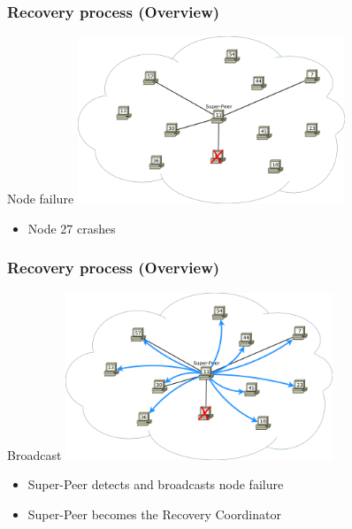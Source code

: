 \documentclass{beamer}
\begin{document}
	\begin{frame}
		\frametitle{Recovery process (Overview)}

		\begin{block}{Node failure}
			\center\includegraphics[width=8cm]{./img/Recovery_Overview_01}

			\begin{itemize}
				\item Node 27 crashes
			\end{itemize}
		\end{block}
	\end{frame}

	\begin{frame}
		\frametitle{Recovery process (Overview)}

		\begin{block}{Broadcast}
			\center\includegraphics[width=8cm]{./img/Recovery_Overview_02}

			\begin{itemize}
				\item Super-Peer detects and broadcasts node failure
				\item Super-Peer becomes the Recovery Coordinator
			\end{itemize}
		\end{block}
	\end{frame}
\end{document}
